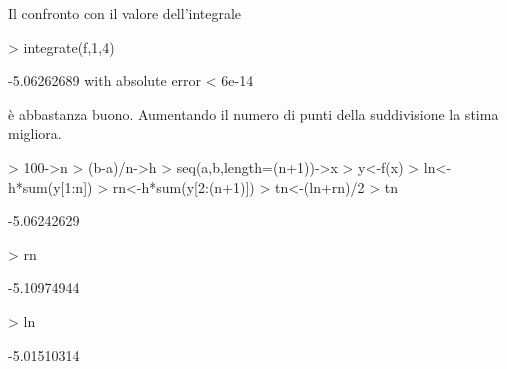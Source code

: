 \documentclass[onecolumn,11pt]{book}
\begin{document}
Il confronto con il valore dell'integrale
\begin{Schunk}
\begin{Sinput}
> integrate(f,1,4)
\end{Sinput}
\begin{Soutput}
-5.06262689 with absolute error < 6e-14
\end{Soutput}
\end{Schunk}
\`e abbastanza buono. Aumentando il numero di punti della suddivisione la stima migliora.
\begin{Schunk}
\begin{Sinput}
> 100->n
> (b-a)/n->h
> seq(a,b,length=(n+1))->x
> y<-f(x)
> ln<-h*sum(y[1:n])
> rn<-h*sum(y[2:(n+1)])
> tn<-(ln+rn)/2
> tn
\end{Sinput}
\begin{Soutput}
[1] -5.06242629
\end{Soutput}
\begin{Sinput}
> rn
\end{Sinput}
\begin{Soutput}
[1] -5.10974944
\end{Soutput}
\begin{Sinput}
> ln
\end{Sinput}
\begin{Soutput}
[1] -5.01510314
\end{Soutput}
\end{Schunk}
\end{document}
